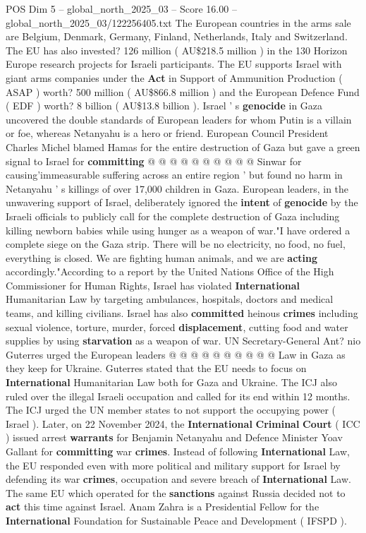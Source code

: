 \begin{textsample}{POS Dim 5 – global\_north\_2025\_03 – Score 16.00 – global\_north\_2025\_03/122256405.txt}
The European countries in the arms sale are Belgium, Denmark, Germany, Finland, Netherlands, Italy and Switzerland.
The EU has also invested? 126 million ( AU\$218.5 million ) in the 130 Horizon Europe research projects for Israeli participants.
The EU supports Israel with giant arms companies under the \textbf{Act} in Support of Ammunition Production ( ASAP ) worth? 500 million ( AU\$866.8 million ) and the European Defence Fund ( EDF ) worth? 8 billion ( AU\$13.8 billion ).
Israel ' s \textbf{genocide} in Gaza uncovered the double standards of European leaders for whom Putin is a villain or foe, whereas Netanyahu is a hero or friend.
European Council President Charles Michel blamed Hamas for the entire destruction of Gaza but gave a green signal to Israel for \textbf{committing} @ @ @ @ @ @ @ @ @ @ Sinwar for causing'immeasurable suffering across an entire region ' but found no harm in Netanyahu ' s killings of over 17,000 children in Gaza.
European leaders, in the unwavering support of Israel, deliberately ignored the \textbf{intent} of \textbf{genocide} by the Israeli officials to publicly call for the complete destruction of Gaza including killing newborn babies while using hunger as a weapon of war."I have ordered a complete siege on the Gaza strip.
There will be no electricity, no food, no fuel, everything is closed.
We are fighting human animals, and we are \textbf{acting} accordingly."According to a report by the United Nations Office of the High Commissioner for Human Rights, Israel has violated \textbf{International} Humanitarian Law by targeting ambulances, hospitals, doctors and medical teams, and killing civilians.
Israel has also \textbf{committed} heinous \textbf{crimes} including sexual violence, torture, murder, forced \textbf{displacement}, cutting food and water supplies by using \textbf{starvation} as a weapon of war.
UN Secretary-General Ant? nio Guterres urged the European leaders @ @ @ @ @ @ @ @ @ @ Law in Gaza as they keep for Ukraine.
Guterres stated that the EU needs to focus on \textbf{International} Humanitarian Law both for Gaza and Ukraine.
The ICJ also ruled over the illegal Israeli occupation and called for its end within 12 months.
The ICJ urged the UN member states to not support the occupying power ( Israel ).
Later, on 22 November 2024, the \textbf{International} \textbf{Criminal} \textbf{Court} ( ICC ) issued arrest \textbf{warrants} for Benjamin Netanyahu and Defence Minister Yoav Gallant for \textbf{committing} war \textbf{crimes}.
Instead of following \textbf{International} Law, the EU responded even with more political and military support for Israel by defending its war \textbf{crimes}, occupation and severe breach of \textbf{International} Law.
The same EU which operated for the \textbf{sanctions} against Russia decided not to \textbf{act} this time against Israel.
Anam Zahra is a Presidential Fellow for the \textbf{International} Foundation for Sustainable Peace and Development ( IFSPD ).

\end{textsample}
